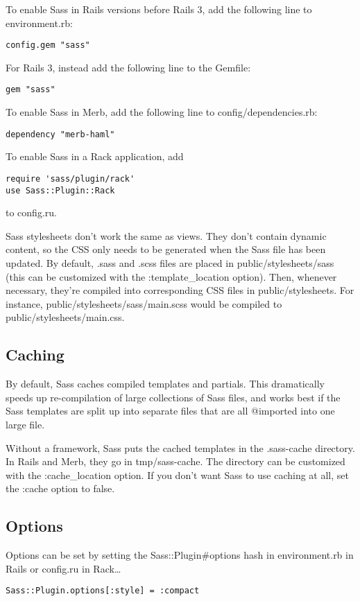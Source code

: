 \documentclass[9pt]{article}
\begin{document}
 To enable Sass in Rails versions before Rails 3, add the following line to environment.rb:
\begin{verbatim}
config.gem "sass"
\end{verbatim}


 For Rails 3, instead add the following line to the Gemfile:
\begin{verbatim}
gem "sass"
\end{verbatim}


 To enable Sass in Merb, add the following line to config/dependencies.rb:
\begin{verbatim}
dependency "merb-haml"
\end{verbatim}


 To enable Sass in a Rack application, add
\begin{verbatim}
require 'sass/plugin/rack'
use Sass::Plugin::Rack
\end{verbatim}


 to config.ru.


 Sass stylesheets don’t work the same as views. They don’t contain dynamic content, so the CSS only needs to be generated when the Sass file has been updated. By default, .sass and .scss files are placed in public/stylesheets/sass (this can be customized with the :template\_location option). Then, whenever necessary, they’re compiled into corresponding CSS files in public/stylesheets. For instance, public/stylesheets/sass/main.scss would be compiled to public/stylesheets/main.css.
\subsection{Caching}


 By default, Sass caches compiled templates and partials. This dramatically speeds up re-compilation of large collections of Sass files, and works best if the Sass templates are split up into separate files that are all @imported into one large file.


 Without a framework, Sass puts the cached templates in the .sass-cache directory. In Rails and Merb, they go in tmp/sass-cache. The directory can be customized with the :cache\_location option. If you don’t want Sass to use caching at all, set the :cache option to false.
\subsection{Options}


 Options can be set by setting the Sass::Plugin\#options hash in environment.rb in Rails or config.ru in Rack…
\begin{verbatim}
Sass::Plugin.options[:style] = :compact
\end{verbatim}
\end{document}
